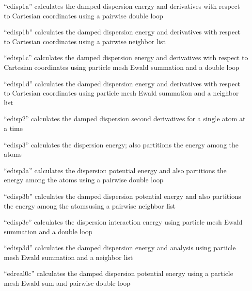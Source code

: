 \documentclass[letterpaper,11pt,english]{sphinxmanual}
\begin{document}

“edisp1a” calculates the damped dispersion energy and
derivatives with respect to Cartesian coordinates using
a pairwise double loop


“edisp1b” calculates the damped dispersion energy and
derivatives with respect to Cartesian coordinates using
a pairwise neighbor list


“edisp1c” calculates the damped dispersion energy and
derivatives with respect to Cartesian coordinates using
particle mesh Ewald summation and a double loop


“edisp1d” calculates the damped dispersion energy and
derivatives with respect to Cartesian coordinates using
particle mesh Ewald summation and a neighbor list


“edisp2” calculates the damped dispersion second derivatives
for a single atom at a time


“edisp3” calculates the dispersion energy; also partitions
the energy among the atoms


“edisp3a” calculates the dispersion potential energy and
also partitions the energy among the atoms using a pairwise
double loop


“edisp3b” calculates the damped dispersion potential energy
and also partitions the energy among the atomsusing a pairwise
neighbor list


“edisp3c” calculates the dispersion interaction energy using
particle mesh Ewald summation and a double loop


“edisp3d” calculates the damped dispersion energy and analysis
using particle mesh Ewald summation and a neighbor list


“edreal0c” calculates the damped dispersion potential energy
using a particle mesh Ewald sum and pairwise double loop
\end{document}

